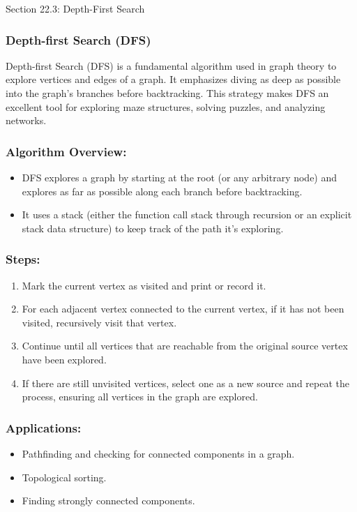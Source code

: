 \begin{notes}{Section 22.3: Depth-First Search}
    \subsubsection*{Depth-first Search (DFS)}

    Depth-first Search (DFS) is a fundamental algorithm used in graph theory to explore vertices and edges of a graph. It emphasizes diving as deep as possible into the graph's branches before 
    backtracking. This strategy makes DFS an excellent tool for exploring maze structures, solving puzzles, and analyzing networks. \vspace*{1em}
    
    \subsubsection*{Algorithm Overview:}
    \begin{itemize}
        \item DFS explores a graph by starting at the root (or any arbitrary node) and explores as far as possible along each branch before backtracking.
        \item It uses a stack (either the function call stack through recursion or an explicit stack data structure) to keep track of the path it's exploring.
    \end{itemize}
    
    \subsubsection*{Steps:}
    \begin{enumerate}
        \item Mark the current vertex as visited and print or record it.
        \item For each adjacent vertex connected to the current vertex, if it has not been visited, recursively visit that vertex.
        \item Continue until all vertices that are reachable from the original source vertex have been explored.
        \item If there are still unvisited vertices, select one as a new source and repeat the process, ensuring all vertices in the graph are explored.
    \end{enumerate}
    
    \subsubsection*{Applications:}
    \begin{itemize}
        \item Pathfinding and checking for connected components in a graph.
        \item Topological sorting.
        \item Finding strongly connected components.
    \end{itemize}
    

\end{notes}
